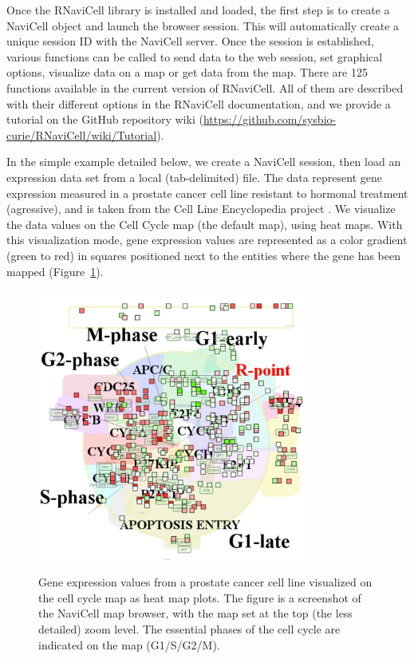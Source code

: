 \documentclass[article]{jss}
\begin{document}
Once the RNaviCell library is installed and loaded, the first step is to create
a NaviCell object and launch the browser session. This will automatically create
a unique session ID with the NaviCell server. Once the session is established,
various functions can be called to send data to the web session, set graphical
options, visualize data on a map or get data from the map. There are 125
functions available in the current version of RNaviCell. All of them are
described with their different options in the RNaviCell documentation, and we
provide a tutorial on the GitHub repository wiki
(\url{https://github.com/sysbio-curie/RNaviCell/wiki/Tutorial}).  

In the simple example detailed below, we create a NaviCell session, then load
an expression data set from a local (tab-delimited) file. The data represent
gene expression measured in a prostate cancer cell line resistant to hormonal
treatment (agressive), and is taken from the Cell Line Encyclopedia project
\citep{barretina2012cancer}. We visualize the data values on the Cell Cycle map
(the default map), using heat maps. With this visualization mode, gene
expression values are represented as a color gradient (green to red) in
squares positioned next to the entities where the gene has been mapped (Figure~\ref{fig:du145}).      


\begin{figure}[!ht]
  \caption{Gene expression values from a prostate cancer cell line visualized
on the cell cycle map as heat map plots. The figure is a screenshot of the
NaviCell map browser, with the map set at the top (the less detailed) zoom
level. The essential phases of the cell cycle are indicated on the map
(G1/S/G2/M).} 
  \centering
  \includegraphics[width=0.8\textwidth]{figures/heatmap.pdf}
  \label{fig:du145}
\end{figure}
\end{document}
